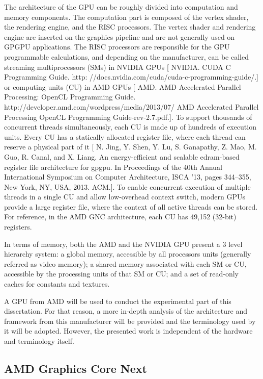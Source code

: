 The architecture of the GPU can be roughly divided into computation and memory components. The computation part is composed of the vertex shader, the rendering engine, and the RISC processors. The vertex shader and rendering engine are inserted on the graphics pipeline and are not generally used on GPGPU applications. The RISC processors are responsible for the GPU programmable calculations, and depending on the manufacturer, can be called streaming multiprocessors (SMs) in NVIDIA GPUs [ NVIDIA. CUDA C Programming Guide. http: //docs.nvidia.com/cuda/cuda-c-programming-guide/.] or computing units (CU) in AMD GPUs [ AMD. AMD Accelerated Parallel Processing: OpenCL Programming Guide. http://developer.amd.com/wordpress/media/2013/07/ AMD Accelerated Parallel Processing OpenCL Programming Guide-rev-2.7.pdf.]. To support thousands of concurrent threads simultaneously, each CU is made up of hundreds of execution units. Every CU has a statically allocated register file, where each thread can reserve a physical part of it [ N. Jing, Y. Shen, Y. Lu, S. Ganapathy, Z. Mao, M. Guo, R. Canal, and X. Liang. An energy-eﬃcient and scalable edram-based register ﬁle architecture for gpgpu. In Proceedings of the 40th Annual International Symposium on Computer Architecture, ISCA ’13, pages 344–355, New York, NY, USA, 2013. ACM.]. To enable concurrent execution of multiple threads in a single CU and allow low-overhead context switch, modern GPUs provide a large register file, where the context of all active threads can be stored. For reference, in the AMD GNC architecture, each CU has ‭49,152‬ (32-bit) registers.

In terms of memory, both the AMD and the NVIDIA GPU present a 3 level hierarchy system: a global memory, accessible by all processors units (generally referred as video memory); a shared memory associated with each SM or CU, accessible by the processing units of that SM or CU; and a set of read-only caches for constants and textures.

A GPU from AMD will be used to conduct the experimental part of this dissertation. For that reason, a more in-depth analysis of the architecture and framework from this manufacturer will be provided and the terminology used by it will be adopted. However, the presented work is independent of the hardware and terminology itself.

\subsection{AMD Graphics Core Next}

